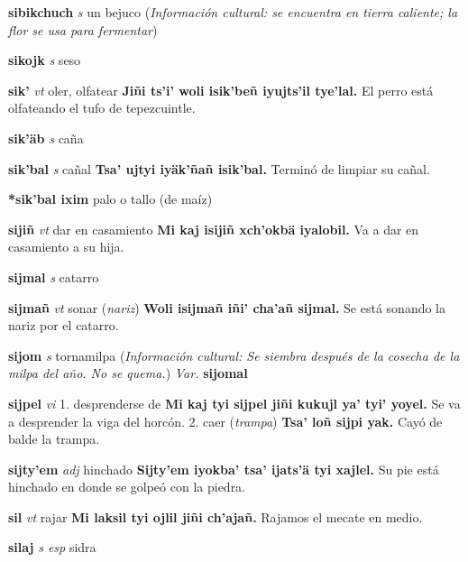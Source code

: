 \documentclass[10pt]{scrbook}
\newcommand{\entry}[1]{\textbf{#1}}
\newcommand{\onedefinition}[1]{#1.}
\newcommand{\partofspeech}[1]{\textit{#1}}
\newcommand{\spanishtranslation}[1]{#1}
\newcommand{\clarification}[1]{(\textit{#1})}
\newcommand{\cholexample}[1]{\textbf{#1}}
\newcommand{\exampletranslation}[1]{#1}
\newcommand{\culturalinformation}[1]{(\textit{#1})}
\newcommand{\variation}[1]{\textit{Var.} \textbf{#1}}
\begin{document}
\begin{multicols}{2}
\entry{sibikchuch}
\partofspeech{s}
\spanishtranslation{un bejuco}
\culturalinformation{Información cultural: se encuentra en tierra caliente; la flor se usa para fermentar}

\entry{sikojk}
\partofspeech{s}
\spanishtranslation{seso}

\entry{sik'}
\partofspeech{vt}
\spanishtranslation{oler, olfatear}
\cholexample{Jiñi ts'i' woli isik'beñ iyujts'il tye'lal.}
\exampletranslation{El perro está olfateando el tufo de tepezcuintle.}

\entry{sik'äb}
\partofspeech{s}
\spanishtranslation{caña}

\entry{sik'bal}
\partofspeech{s}
\spanishtranslation{cañal}
\cholexample{Tsa' ujtyi iyäk'ñañ isik'bal.}
\exampletranslation{Terminó de limpiar su cañal.}

\entry{*sik'bal ixim}
\spanishtranslation{palo o tallo (de maíz)}

\entry{sijiñ}
\partofspeech{vt}
\spanishtranslation{dar en casamiento}
\cholexample{Mi kaj isijiñ xch'okbä iyalobil.}
\exampletranslation{Va a dar en casamiento a su hija.}

\entry{sijmal}
\partofspeech{s}
\spanishtranslation{catarro}

\entry{sijmañ}
\partofspeech{vt}
\spanishtranslation{sonar}
\clarification{nariz}
\cholexample{Woli isijmañ iñi' cha'añ sijmal.}
\exampletranslation{Se está sonando la nariz por el catarro.}

\entry{sijom}
\partofspeech{s}
\spanishtranslation{tornamilpa}
\culturalinformation{Información cultural: Se siembra después de la cosecha de la milpa del año. No se quema.}
\variation{sijomal}

\entry{sijpel}
\partofspeech{vi}
\onedefinition{1}
\spanishtranslation{desprenderse de}
\cholexample{Mi kaj tyi sijpel jiñi kukujl ya' tyi' yoyel.}
\exampletranslation{Se va a desprender la viga del horcón.}
\onedefinition{2}
\spanishtranslation{caer}
\clarification{trampa}
\cholexample{Tsa' loñ sijpi yak.}
\exampletranslation{Cayó de balde la trampa.}

\entry{sijty'em}
\partofspeech{adj}
\spanishtranslation{hinchado}
\cholexample{Sijty'em iyokba' tsa' ijats'ä tyi xajlel.}
\exampletranslation{Su pie está hinchado en donde se golpeó con la piedra.}

\entry{sil}
\partofspeech{vt}
\spanishtranslation{rajar}
\cholexample{Mi laksil tyi ojlil jiñi ch'ajañ.}
\exampletranslation{Rajamos el mecate en medio.}

\entry{silaj}
\partofspeech{s esp}
\spanishtranslation{sidra}


\end{multicols}
\end{document}
